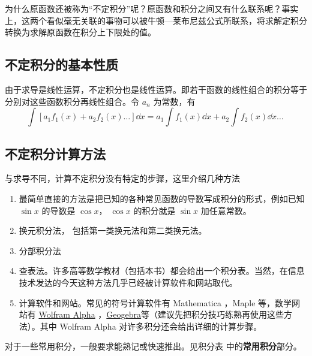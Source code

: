 为什么原函数还被称为“不定积分”呢？原函数和积分之间又有什么联系呢？事实上，这两个看似毫无关联的事物可以被牛顿—莱布尼兹公式所联系，将求解定积分转换为求解原函数在积分上下限处的值。

\subsection{不定积分的基本性质}

由于求导是线性运算，不定积分也是线性运算。即若干函数的线性组合的积分等于分别对这些函数积分再线性组合。令 $a_n$ 为常数，有
\begin{equation}\label{eq_Int_4}
\int [a_1 f_1(x) + a_2 f_2(x)\dots] \dd{x}  = a_1 \int f_1(x) \dd{x} + a_2 \int f_2(x) \dd{x} \dots~
\end{equation}

\subsection{不定积分计算方法}
与求导不同，计算不定积分没有特定的步骤，这里介绍几种方法
\begin{enumerate}
\item 最简单直接的方法是把已知的各种常见函数的导数写成积分的形式，例如已知 $\sin x$ 的导数是 $\cos x$， $\cos x$ 的积分就是 $\sin x$ 加任意常数。
\item 换元积分法， 包括第一类换元法和第二类换元法。

\item 分部积分法

\item 查表法。许多高等数学教材（包括本书）都会给出一个积分表。当然，在信息技术发达的今天这种方法几乎已经被计算软件和网站取代。

\item 计算软件和网站。常见的符号计算软件有 Mathematica %
，Maple 等，数学网站有 \href{https://www.wolframalpha.com}{Wolfram Alpha}
，\href{https://www.geogebra.org}{Geogebra}等（建议先把积分技巧练熟再使用这些方法）。其中 Wolfram Alpha 对许多积分还会给出详细的计算步骤。
 \end{enumerate}

对于一些常用积分，一般要求能熟记或快速推出。见积分表 中的\textbf{常用积分}部分。
